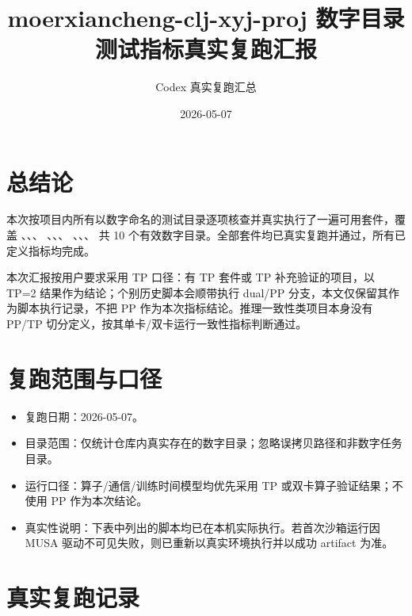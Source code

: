 \documentclass[UTF8,a4paper,11pt]{ctexart}
\title{moerxiancheng-clj-xyj-proj 数字目录测试指标真实复跑汇报}
\author{Codex 真实复跑汇总}
\date{2026-05-07}
\begin{document}
\maketitle

\section{总结论}

本次按项目内所有以数字命名的测试目录逐项核查并真实执行了一遍可用套件，覆盖
、、、
、、、
、、、
 共 10 个有效数字目录。全部套件均已真实复跑并通过，所有已定义指标均完成。

本次汇报按用户要求采用 TP 口径：有 TP 套件或 TP 补充验证的项目，以 TP=2 结果作为结论；个别历史脚本会顺带执行 dual/PP 分支，本文仅保留其作为脚本执行记录，不把 PP 作为本次指标结论。推理一致性类项目本身没有 PP/TP 切分定义，按其单卡/双卡运行一致性指标判断通过。

\section{复跑范围与口径}

\begin{itemize}
  \item 复跑日期：2026-05-07。
  \item 目录范围：仅统计仓库内真实存在的数字目录；忽略误拷贝路径和非数字任务目录。
  \item 运行口径：算子/通信/训练时间模型均优先采用 TP 或双卡算子验证结果；不使用 PP 作为本次结论。
  \item 真实性说明：下表中列出的脚本均已在本机实际执行。若首次沙箱运行因 MUSA 驱动不可见失败，则已重新以真实环境执行并以成功 artifact 为准。
\end{itemize}

\section{真实复跑记录}
\end{document}
